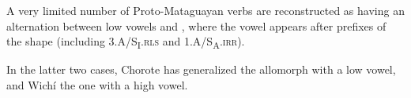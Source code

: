 A very limited number of Proto-Mataguayan verbs are reconstructed as having an alternation between low vowels and , where the vowel  appears after prefixes of the shape  (including 3.A/S\textsubscript{I}.{\textsc{rls}} and 1.A/S\textsubscript{A}.{\textsc{irr}}).

\begin{exe}
    \ex \goaway
    \ex \cry
    \ex \diecw
\end{exe}

In the latter two cases, Chorote has generalized the allomorph with a low vowel, and Wichí the one with a high vowel.
